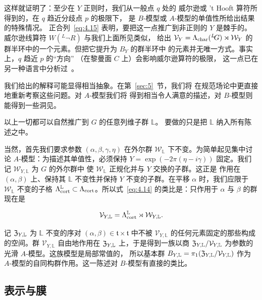 这样就证明了：至少在 $Y$ 正则时，我们从一般点 $q$ 处的
威尔逊或 't Hooft 算符所得到的，在 $q$ 趋近分歧点 $p$ 的极限下，
是 $B$-模型或 $A$-模型的单值性所给出结果的特殊情况。
正合列~\eqref{eq:4.15} 表明，要把这一点推广到非正则的 $Y$ 是棘手的。
威尔逊线算符 $W(^L\neg R)$ 与我们上面所见类似，
给出 $\mathcal V_Y=\Lambda_{\rm char}({}^L\negthinspace G)\rtimes
{\mathcal W}_Y$ 的群半环中的一个元素。但把它提升为 $B_Y$ 的群半环中
的元素并无唯一方式。事实上，$q$ 趋近 $p$ 的“方向”
（在黎曼面 $C$ 上）会影响威尔逊算符的极限，
这一点已在另一种语言中分析过~\cite{ref75}。

我们给出的解释可能显得相当抽象。在第~\ref{sec:5}~节，我们将
在规范场论中更直接地重新考察这些问题。对 $A$-模型我们将
得到相当令人满意的描述，对 $B$-模型则能得到一些洞见。

\bigskip{}

以上一切都可以自然推广到 $G$ 的任意列维子群 $\mathbb{L}$。
要做的只是把 $\mathbb{L}$ 纳入所有陈述之中。

当然，首先我们要求参数
$(\alpha,\beta,\gamma,\eta)$ 在外尔群
${\mathcal W}_\mathbb{L}$ 下不变。为简单起见集中讨论
$A$-模型：为描述其单值性，必须保持
$Y=\exp(-2\pi(\eta-i\gamma))$ 固定。我们记
${\mathcal W}_{Y,\mathbb{L}}$ 为 $G$ 的外尔群中
使 ${\mathcal W}_\mathbb{L}$ 正规化并与 $Y$ 交换的子群。这正是
作用在 $(\alpha,\beta)$ 上、保持其
$\mathbb{L}$ 不变性并保持 $Y$ 不变的子群。在平移
$\alpha$ 时，我们应限于 ${\mathcal
W}_\mathbb{L}$ 不变的子格 $\Lambda_{\rm cort}^\mathbb{L}\subset
\Lambda_{\rm cort}$。所以式~\eqref{eq:4.14} 的类比是：只作用于 $\alpha$ 与 $\beta$ 的群
现在是

\setcounter{equation}{18}
\begin{equation}\label{eq:4.19}
  {\mathcal
V}_{Y,\mathbb{L}}=\Lambda_{\rm cort}^\mathbb{L}\rtimes{\mathcal W}_{Y,\mathbb{L}}.
\end{equation}


记 $\mathfrak{Z}_{Y,\mathbb{L}}$ 为 $\mathbb{L}$ 不变的序对
$(\alpha,\beta)\in \mathfrak t\times \mathfrak
t$ 中不被 ${\mathcal V}_{Y,\mathbb{L}}$ 的任何元素固定的那些构成的空间。群 ${\mathcal V}_{Y,\mathbb{L}}$
自由地作用在 $\mathfrak{Z}_{Y,\mathbb{L}}$ 上，于是得到一族以商 $\mathfrak{Z}_{Y,\mathbb{L}}/{\mathcal V}_{Y,\mathbb{L}}$ 为参数的
光滑 $A$-模型。这族模型是局部常值的，
所以基本群 $B_{Y,\mathbb{L}}=\pi_1(\mathfrak{Z}_{Y,\mathbb{L}}/{\mathcal V}_{Y,\mathbb{L}})$
作为
$A$-模型的自同构群作用。这一陈述对 $B$-模型有直接的类比。

\subsection{表示与膜}

